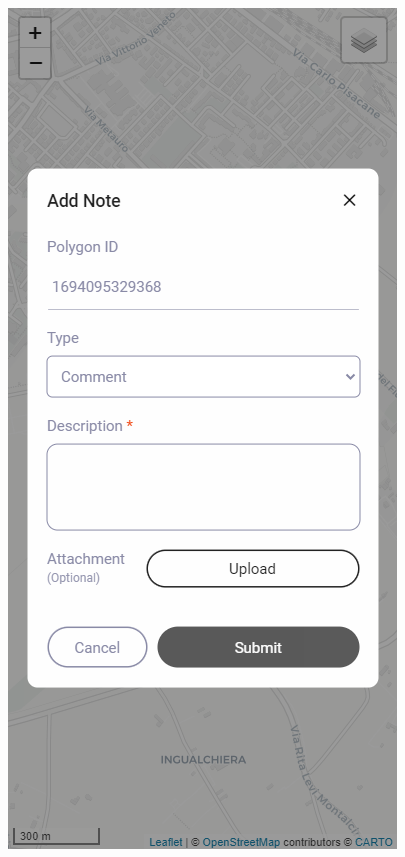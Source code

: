 \begin{figure}[H]
\begin{minipage}{0.24\textwidth}
    \end{minipage}
    \hfill
    \begin{minipage}{0.24\textwidth}
        \centering
        \includegraphics[width=\textwidth]{res/web/mobile-add-note}

\end{minipage}
\end{figure}
